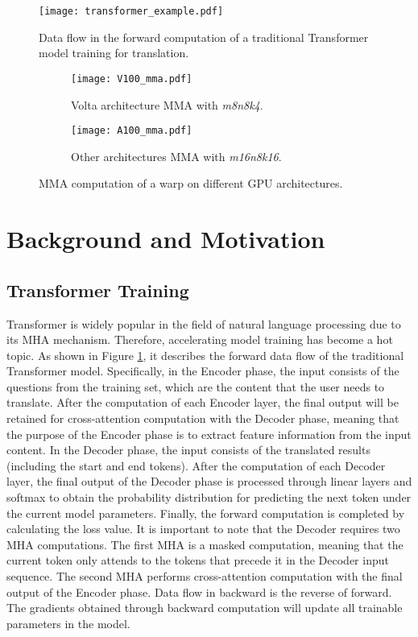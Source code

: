 \documentclass[10pt,twocolumn]{article}
\begin{document}
\begin{figure}[htbp] \small
  \centering
  \texttt{[image: transformer\_example.pdf]}
  \caption{Data flow in the forward computation of a traditional Transformer model training for translation.}
  \label{fig:transformer_example}
\end{figure}

\begin{figure*}[htbp] \small
  \centering
    \begin{subfigure}[b]{0.45\textwidth}
        \texttt{[image: V100\_mma.pdf]}
        \caption{Volta architecture MMA with \textit{m8n8k4}.}
        \label{fig:mma_m8n8k4-a}
    \end{subfigure}
    \hspace{0.0cm}
    \begin{subfigure}[b]{0.45\textwidth}
        \texttt{[image: A100\_mma.pdf]}
        \vspace{8mm}
        \caption{Other architectures MMA with \textit{m16n8k16}.}
        \label{fig:mma_m8n8k4-b}
    \end{subfigure}
  \caption{MMA computation of a warp on different GPU architectures.}
  \label{fig:mma_m8n8k4}
\end{figure*}

\section{Background and Motivation} \label{sec:BandM}
\subsection{Transformer Training}
Transformer is widely popular in the field of natural language processing due to its MHA mechanism. 
Therefore, accelerating model training has become a hot topic. 
As shown in Figure \ref{fig:transformer_example}, it describes the forward data flow of the traditional Transformer model.
Specifically, in the Encoder phase, the input consists of the questions from the training set, which are the content that the user needs to translate.
After the computation of each Encoder layer, the final output will be retained for cross-attention computation with the Decoder phase, meaning that the purpose of the Encoder phase is to extract feature information from the input content.
In the Decoder phase, the input consists of the translated results (including the start and end tokens).
After the computation of each Decoder layer, the final output of the Decoder phase is processed through linear layers and softmax to obtain the probability distribution for predicting the next token under the current model parameters. Finally, the forward computation is completed by calculating the loss value.
It is important to note that the Decoder requires two MHA computations. 
The first MHA is a masked computation, meaning that the current token only attends to the tokens that precede it in the Decoder input sequence. 
The second MHA performs cross-attention computation with the final output of the Encoder phase.
Data flow in backward is the reverse of forward. The gradients obtained through backward computation will update all trainable parameters in the model.
\end{document}
